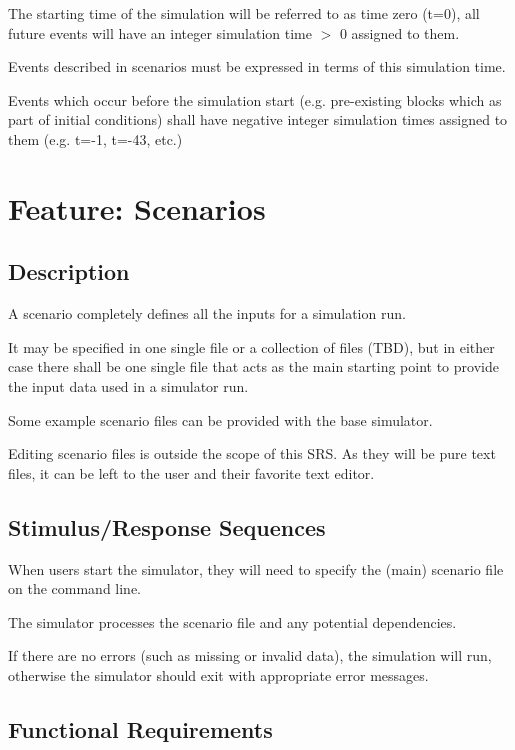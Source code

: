 \documentclass{scrreprt}
\begin{document}
The starting time of the simulation will be referred to as time zero
(t=0), all future events will have an integer simulation time $>$ 0
assigned to them.

Events described in scenarios must be expressed in terms of this
simulation time.

Events which occur before the simulation start (e.g. pre-existing blocks
which as part of initial conditions) shall have negative integer simulation
times assigned to them (e.g. t=-1, t=-43, etc.)



\section{Feature: Scenarios}

\subsection{Description}

A scenario completely defines all the inputs for a simulation run.

It may be specified in one single file or a collection of files (TBD),
but in either case there shall be one single file that acts as the
main starting point to provide the input data used in a simulator run.

Some example scenario files can be provided with the base simulator.

Editing scenario files is outside the scope of this SRS. As they will be pure
text files, it can be left to the user and their favorite text editor.


\subsection{Stimulus/Response Sequences}

When users start the simulator, they will need to specify the (main)
scenario file on the command line.

The simulator processes the scenario file and any potential dependencies.

If there are no errors (such as missing or invalid data), the simulation
will run, otherwise the simulator should exit with appropriate error messages.


\subsection{Functional Requirements}
\end{document}
